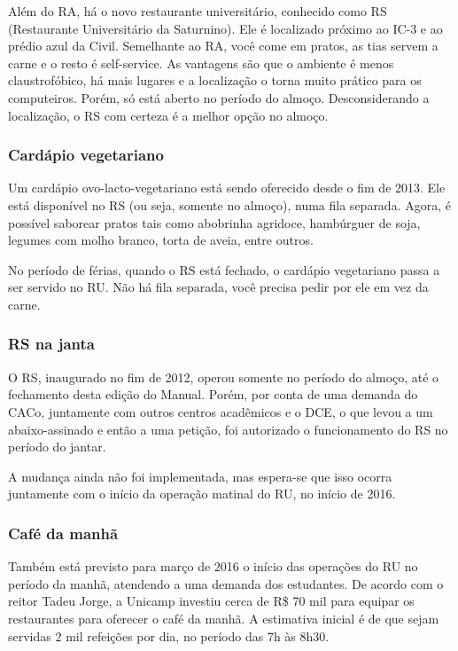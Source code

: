 Além do RA, há o novo restaurante universitário, conhecido como RS (Restaurante
Universitário da Saturnino). Ele é localizado próximo ao IC-3 e ao prédio azul
da Civil. Semelhante ao RA, você come em pratos, as tias servem a carne e o
resto é self-service. As vantagens são que o ambiente é menos claustrofóbico, há
mais lugares e a localização o torna muito prático para os computeiros. Porém,
só está aberto no período do almoço. Desconsiderando a localização, o RS com
certeza é a melhor opção no almoço.

\subsubsection{Cardápio vegetariano}

Um cardápio ovo-lacto-vegetariano está sendo oferecido desde o fim de 2013. Ele
está disponível no RS (ou seja, somente no almoço), numa fila separada. Agora, é
possível saborear pratos tais como abobrinha agridoce, hambúrguer de soja,
legumes com molho branco, torta de aveia, entre outros.

No período de férias, quando o RS está fechado, o cardápio vegetariano passa a
ser servido no RU. Não há fila separada, você precisa pedir por ele em vez da
carne.

\subsubsection{RS na janta}

O RS, inaugurado no fim de 2012, operou somente no período do almoço, até o
fechamento desta edição do Manual. Porém, por conta de uma demanda do CACo,
juntamente com outros centros acadêmicos e o DCE, o que levou a um
abaixo-assinado e então a uma petição, foi autorizado o funcionamento do RS no
período do jantar.

A mudança ainda não foi implementada, mas espera-se que isso ocorra juntamente
com o início da operação matinal do RU, no início de 2016.

\subsubsection{Café da manhã}

Também está previsto para março de 2016 o início das operações do RU no período
da manhã, atendendo a uma demanda dos estudantes. De acordo com o reitor Tadeu
Jorge, a Unicamp investiu cerca de R\$ 70 mil para equipar os restaurantes para
oferecer o café da manhã. A estimativa inicial é de que sejam servidas 2 mil
refeições por dia, no período das 7h às 8h30.

